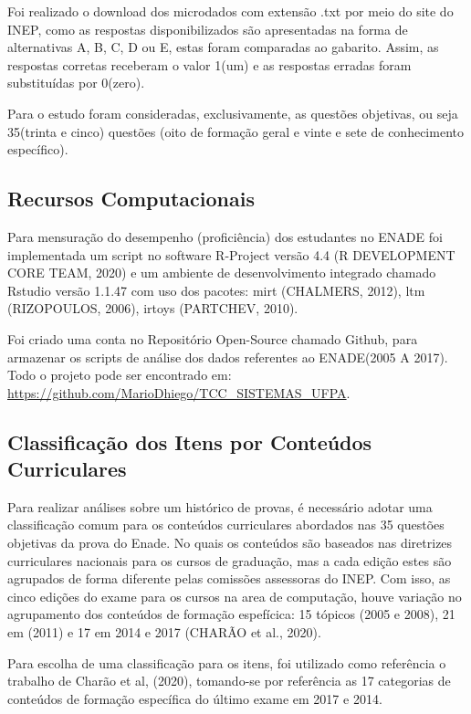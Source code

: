 \documentclass[12pt]{article}
\begin{document}
Foi realizado o download dos microdados com extensão .txt por meio do site do INEP, como as respostas disponibilizados são apresentadas na forma de alternativas A, B, C, D ou E, estas foram comparadas ao gabarito. Assim, as respostas corretas receberam o valor 1(um) e as respostas erradas foram substituídas por 0(zero). 

Para o estudo foram consideradas, exclusivamente, as questões objetivas, ou seja 35(trinta e cinco) questões (oito de formação geral e vinte e sete de conhecimento específico).


\subsection{Recursos Computacionais}
\label{sec:metbet}

Para mensuração do desempenho (proficiência) dos estudantes no ENADE foi implementada um script no software R-Project versão 4.4 (R DEVELOPMENT CORE TEAM, 2020) e um ambiente de desenvolvimento integrado chamado Rstudio versão 1.1.47 com uso dos pacotes: mirt (CHALMERS, 2012), ltm (RIZOPOULOS, 2006), irtoys (PARTCHEV, 2010).

Foi criado uma conta no Repositório Open-Source chamado Github, para armazenar os scripts de análise dos dados referentes ao ENADE(2005 A 2017). Todo o projeto pode ser encontrado em: \url{https://github.com/MarioDhiego/TCC_SISTEMAS_UFPA}.

\newpage
\subsection{Classificação dos Itens por Conteúdos Curriculares}

Para realizar análises sobre um histórico de provas, é necessário adotar uma classificação comum para os conteúdos curriculares abordados nas 35 questões objetivas da prova do Enade. No quais os conteúdos são baseados nas diretrizes curriculares nacionais para os cursos de graduação, mas a cada edição estes são agrupados de forma diferente pelas comissões assessoras do INEP. Com isso, as cinco edições do exame para os cursos na area de computação, houve variação no agrupamento dos conteúdos de formação espefícica: 15 tópicos (2005 e 2008), 21 em (2011) e 17 em 2014 e 2017 (CHARÃO et al., 2020).

Para escolha de uma classificação para os itens, foi utilizado como referência o trabalho de Charão et al, (2020), tomando-se por referência as 17 categorias de conteúdos de formação específica do último exame em 2017 e 2014. 
\end{document}
